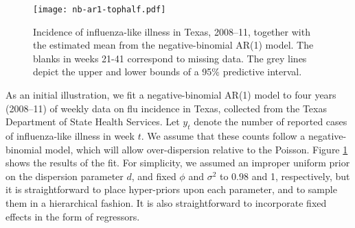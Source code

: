 \documentclass[12pt]{article}
\newcommand{\Polya}{P\'{o}lya}
\begin{document}


\begin{figure}
  \begin{center}
    \texttt{[image: nb-ar1-tophalf.pdf]}
    \caption{\label{fig:nb-ar1} Incidence of influenza-like illness in Texas,
      2008--11, together with the estimated mean from the negative-binomial AR(1)
      model.  The blanks in weeks 21-41 correspond to missing data.  The grey lines
      depict the upper and lower bounds of a 95$\%$ predictive interval.}
  \end{center}
\end{figure}

As an initial illustration, we fit a negative-binomial AR(1) model to four years
(2008--11) of weekly data on flu incidence in Texas, collected from the Texas
Department of State Health Services.  Let $y_t$ denote the number of reported
cases of influenza-like illness in week $t$.  We assume that these counts follow
a negative-binomial model, which will allow over-dispersion relative to the
Poisson.
Figure \ref{fig:nb-ar1} shows the results of the fit. For simplicity, we assumed
an improper uniform prior on the dispersion parameter $d$, and fixed $\phi$ and
$\sigma^2$ to $0.98$ and 1, respectively, but it is straightforward to place
hyper-priors upon each parameter, and to sample them in a hierarchical fashion.
It is also straightforward to incorporate fixed effects in the form of
regressors.

\end{document}
